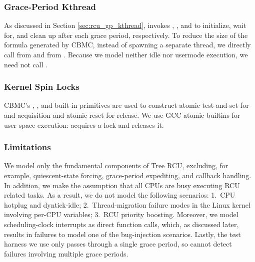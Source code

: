 \subsubsection*{Grace-Period Kthread}
As discussed in Section \ref{sec:rcu_gp_kthread}, 
invokes , , and 
to initialize, wait for, and clean up after each grace period, respectively.
To reduce the size of the formula generated by CBMC, instead of spawning a
separate thread, we directly call  from
 and  from
.
Because we model neither idle nor usermode execution, we need not
call .

\subsubsection*{Kernel Spin Locks}
CBMC's
, , and
 built-in primitives are used to construct atomic test-and-set
for  and  acquisition and
atomic reset for release.
%
We use GCC atomic builtins for user-space execution:
 acquires a
lock and  releases it.


\subsubsection*{Limitations}
We model only the fundamental components of Tree RCU, excluding, for example,
quiescent-state forcing, grace-period expediting, and callback handling.
%
In addition, we make the assumption that all CPUs are busy executing RCU related tasks. 
As a result, we do not model the following scenarios: 1.~CPU hotplug and dyntick-idle; 
2.~Thread-migration failure modes in the Linux kernel involving per-CPU variables; 
3.~RCU priority boosting. Moreover, we model scheduling-clock interrupts as 
direct function calls, which, as discussed later, results in failures to model one of 
the bug-injection scenarios. Lastly, the test harness we use only passes through a 
single grace period, so cannot detect failures involving multiple grace periods.
